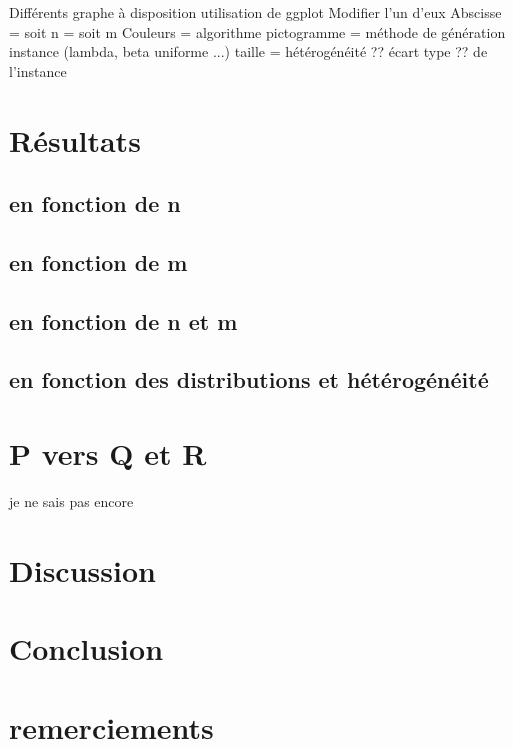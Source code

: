 \documentclass[a4paper,12pt]{report}
\theoremstyle{plain}				%
\theoremstyle{definition}				%
\begin{document}
Différents graphe à disposition
utilisation de ggplot
Modifier l'un d'eux
Abscisse 	= soit n
			= soit m
Couleurs = algorithme
pictogramme = méthode de génération instance (lambda, beta uniforme ...) 
taille = hétérogénéité ?? écart type ?? de l'instance




\section{Résultats} \label{sec:resultats}

\subsection{en fonction de n}\label{subsec:en fonction de n}

\subsection{en fonction de m}\label{subsec:en fonction de m}

\subsection{en fonction de n et m}\label{subsec:en fonction de n et m}

\subsection{en fonction des distributions et hétérogénéité}
\label{subsec:en fonction des distributions et hétérogénéité}



\section{P vers Q et R} \label{sec:P vers Q et R}

je ne sais pas encore



\section{Discussion} \label{sec:discussion}


\section{Conclusion} \label{sec:conclusion}

\section{remerciements}


\end{document}
